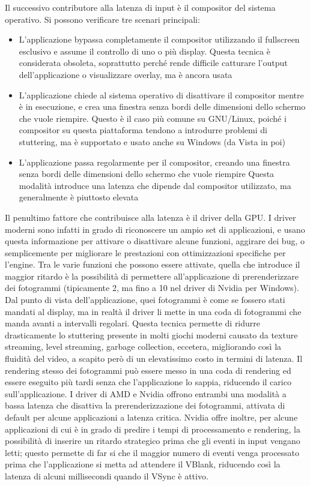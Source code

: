 Il successivo contributore alla latenza di input è il compositor del sistema operativo. Si possono verificare tre scenari principali:
\begin{itemize}
	\item L'applicazione bypassa completamente il compositor utilizzando il fullscreen esclusivo e assume il controllo di uno o più display. Questa tecnica è considerata obsoleta, soprattutto perché rende difficile catturare l'output dell'applicazione o visualizzare overlay, ma è ancora usata
	\item L'applicazione chiede al sistema operativo di disattivare il compositor mentre è in esecuzione, e crea una finestra senza bordi delle dimensioni dello schermo che vuole riempire. Questo è il caso più comune su GNU/Linux, poiché i compositor su questa piattaforma tendono a introdurre problemi di stuttering, ma è supportato e usato anche su Windows (da Vista in poi)
	\item L'applicazione passa regolarmente per il compositor, creando una finestra senza bordi delle dimensioni dello schermo che vuole riempire Questa modalità introduce una latenza che dipende dal compositor utilizzato, ma generalmente è piuttosto elevata
\end{itemize}

Il penultimo fattore che contribuisce alla latenza è il driver della GPU. I driver moderni sono infatti in grado di riconoscere un ampio set di applicazioni, e usano questa informazione per attivare o disattivare alcune funzioni, aggirare dei bug, o semplicemente per migliorare le prestazioni con ottimizzazioni specifiche per l'engine. Tra le varie funzioni che possono essere attivate, quella che introduce il maggior ritardo è la possibilità di permettere all'applicazione di prerenderizzare dei fotogrammi (tipicamente 2, ma fino a 10 nel driver di Nvidia per Windows). Dal punto di vista dell'applicazione, quei fotogrammi è come se fossero stati mandati al display, ma in realtà il driver li mette in una coda di fotogrammi che manda avanti a intervalli regolari. Questa tecnica permette di ridurre drasticamente lo stuttering presente in molti giochi moderni causato da texture streaming, level streaming, garbage collection, eccetera, migliorando così la fluidità del video, a scapito però di un elevatissimo costo in termini di latenza. Il rendering stesso dei fotogrammi può essere messo in una coda di rendering ed essere eseguito più tardi senza che l'applicazione lo sappia, riducendo il carico sull'applicazione. I driver di AMD e Nvidia offrono entrambi una modalità a bassa latenza che disattiva la prerenderizzazione dei fotogrammi, attivata di default per alcune applicazioni a latenza critica. Nvidia offre inoltre, per alcune applicazioni di cui è in grado di predire i tempi di processamento e rendering, la possibilità di inserire un ritardo strategico prima che gli eventi in input vengano letti; questo permette di far si che il maggior numero di eventi venga processato prima che l'applicazione si metta ad attendere il VBlank, riducendo così la latenza di alcuni millisecondi quando il VSync è attivo.


